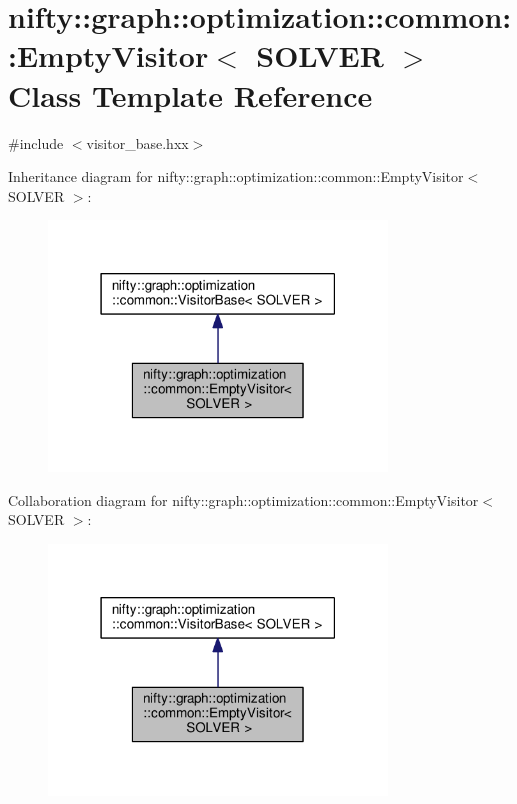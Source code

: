 \hypertarget{classnifty_1_1graph_1_1optimization_1_1common_1_1EmptyVisitor}{}\section{nifty\+:\+:graph\+:\+:optimization\+:\+:common\+:\+:Empty\+Visitor$<$ S\+O\+L\+V\+E\+R $>$ Class Template Reference}
\label{classnifty_1_1graph_1_1optimization_1_1common_1_1EmptyVisitor}


{\ttfamily \#include $<$visitor\+\_\+base.\+hxx$>$}



Inheritance diagram for nifty\+:\+:graph\+:\+:optimization\+:\+:common\+:\+:Empty\+Visitor$<$ S\+O\+L\+V\+E\+R $>$\+:\nopagebreak
\begin{figure}[H]
\begin{center}
\leavevmode
\includegraphics[width=255pt]{classnifty_1_1graph_1_1optimization_1_1common_1_1EmptyVisitor__inherit__graph}
\end{center}
\end{figure}


Collaboration diagram for nifty\+:\+:graph\+:\+:optimization\+:\+:common\+:\+:Empty\+Visitor$<$ S\+O\+L\+V\+E\+R $>$\+:\nopagebreak
\begin{figure}[H]
\begin{center}
\leavevmode
\includegraphics[width=255pt]{classnifty_1_1graph_1_1optimization_1_1common_1_1EmptyVisitor__coll__graph}
\end{center}
\end{figure}
